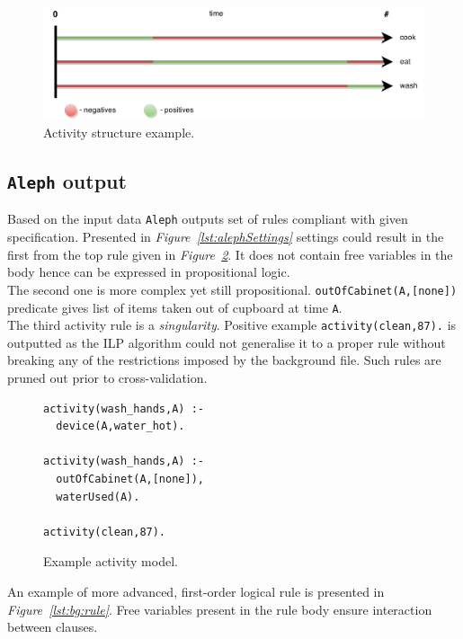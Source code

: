 \documentclass[10pt, a4paper, pdflatex, leqno, twoside, openright]{report}
\begin{document}
\begin{figure}[htb]
  \centering
  \includegraphics[width=.85\textwidth]{./gfx/activityStructure}
  \caption{Activity structure example.\label{fig:timepoints}}
\end{figure}

    \subsection{\texttt{Aleph} output}
Based on the input data \texttt{Aleph} outputs set of rules compliant with given specification. Presented in \emph{Figure~\ref{lst:alephSettings}} settings could result in the first from the top rule given in \emph{Figure~\ref{lst:alephOut}}. It does not contain free variables in the body hence can be expressed in propositional logic.\\
The second one is more complex yet still propositional. \texttt{outOfCabinet(A,[none])} predicate gives list of items taken out of cupboard at time \texttt{A}.\\
The third activity rule is a \emph{singularity}. Positive example \texttt{activity(clean,87).} is outputted as the ILP algorithm could not generalise it to a proper rule without breaking any of the restrictions imposed by the background file. Such rules are pruned out prior to cross-validation.\\

\begin{figure}[htb] %
  \begin{verbatim}
activity(wash_hands,A) :-
  device(A,water_hot).

activity(wash_hands,A) :-
  outOfCabinet(A,[none]),
  waterUsed(A).

activity(clean,87).
  \end{verbatim}
  \caption{Example activity model.\label{lst:alephOut}}
\end{figure}

An example of more advanced, first-order logical rule is presented in \emph{Figure~\ref{lst:bg:rule}}. Free variables present in the rule body ensure interaction between clauses.
\end{document}
